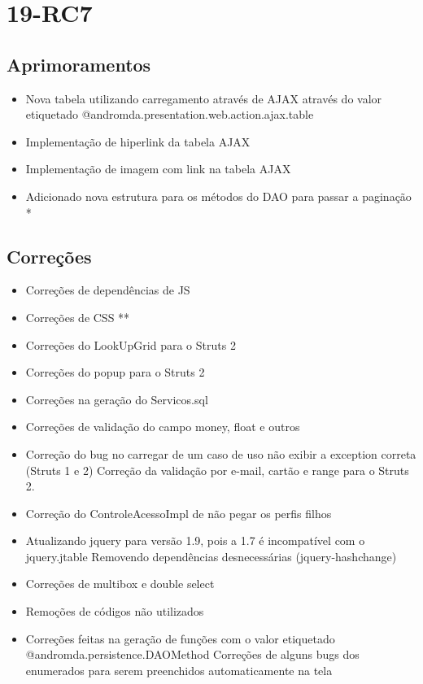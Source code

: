 \section{19-RC7}

\subsection{Aprimoramentos}

\begin{itemize}
  \item Nova tabela utilizando carregamento através de AJAX através do valor etiquetado @andromda.presentation.web.action.ajax.table
  \item Implementação de hiperlink da tabela AJAX 
  \item Implementação de imagem com link na tabela AJAX
  \item Adicionado nova estrutura para os métodos do DAO para passar a paginação
*
\end{itemize}

\subsection{Correções}

\begin{itemize}
  \item Correções de dependências de JS 
  \item Correções de CSS **
  \item Correções do LookUpGrid para o Struts 2
  \item Correções do popup para o Struts 2
  \item Correções na geração do Servicos.sql
  \item Correções de validação do campo money, float e outros 
  \item Correção do bug no carregar de um caso de uso não exibir a exception
correta (Struts 1 e 2) Correção da validação por e-mail, cartão e range para o Struts 2.
  \item Correção do ControleAcessoImpl de não pegar os perfis filhos 
  \item Atualizando jquery para versão 1.9, pois a 1.7 é incompatível com o
jquery.jtable Removendo dependências desnecessárias (jquery-hashchange)
  \item Correções de multibox e double select
  \item Remoções de códigos não utilizados
  \item Correções feitas na geração de funções com o valor etiquetado
@andromda.persistence.DAOMethod Correções de alguns bugs dos enumerados para serem preenchidos automaticamente na tela
\end{itemize}

